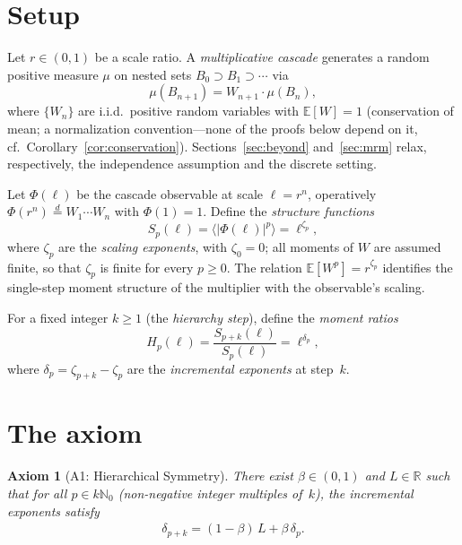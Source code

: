 \documentclass[pdflatex,sn-mathphys-num]{sn-jnl}
\theoremstyle{thmstyleone}
\theoremstyle{thmstyletwo}
\theoremstyle{thmstylethree}
\newtheorem*{axiom}{Axiom}
\begin{document}
\section{Setup}
\label{sec:setup}

Let $r \in (0,1)$ be a scale ratio.  A \emph{multiplicative cascade}
generates a random positive measure $\mu$ on nested sets $B_0 \supset
B_1 \supset \cdots$ via
\[
  \mu(B_{n+1}) = W_{n+1} \cdot \mu(B_n),
\]
where $\{W_n\}$ are i.i.d.\ positive random variables with
$\mathbb{E}[W] = 1$ (conservation of mean; a normalization
convention---none of the proofs below depend on it, cf.\
Corollary~\ref{cor:conservation}).  Sections~\ref{sec:beyond}
and~\ref{sec:mrm} relax, respectively, the independence assumption
and the discrete setting.

Let $\Phi(\ell)$ be the cascade observable at scale $\ell = r^n$,
operatively $\Phi(r^n) \stackrel{d}{=} W_1\cdots W_n$ with
$\Phi(1) = 1$.  Define the \emph{structure functions}
\[
  S_p(\ell) = \langle |\Phi(\ell)|^p \rangle = \ell^{\zeta_p},
\]
where $\zeta_p$ are the \emph{scaling exponents}, with $\zeta_0 = 0$;
all moments of $W$ are assumed finite, so that $\zeta_p$ is finite
for every $p \ge 0$.  The relation $\mathbb{E}[W^p] = r^{\zeta_p}$
identifies the single-step moment structure of the multiplier with
the observable's scaling.

For a fixed integer $k \geq 1$ (the \emph{hierarchy step}), define
the \emph{moment ratios}
\[
  H_p(\ell) = \frac{S_{p+k}(\ell)}{S_p(\ell)} = \ell^{\delta_p},
\]
where $\delta_p = \zeta_{p+k} - \zeta_p$ are the \emph{incremental
exponents} at step~$k$.


\section{The axiom}
\label{sec:axiom}

\begin{axiom}[A1: Hierarchical Symmetry]
There exist $\beta \in (0,1)$ and $L \in \mathbb{R}$ such that for
all $p \in k\mathbb{N}_0$ (non-negative integer multiples of~$k$),
the incremental exponents satisfy
\begin{align}\label{eq:A1}
  \delta_{p+k}
  = (1 - \beta)\,L + \beta\,\delta_p.
  \tag{$*$}
\end{align}
\end{axiom}
\end{document}
